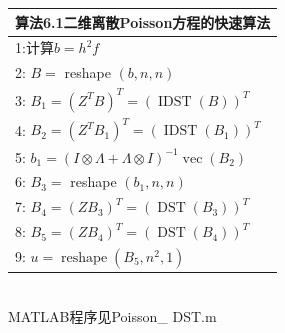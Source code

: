 \documentclass[notheorems,serif]{beamer}
\begin{document}
\begin{frame}
\begin{tabular}{l}
\hline
{\color{blue}算法6.1}二维离散Poisson方程的快速算法\\
\hline
1:计算$b=h^{2} f$\\
2: $B=$ reshape $(b, n, n)$\\
3: $B_{1}=\left(Z^{T} B\right)^{T}=(\operatorname{IDST}(B))^{T}$\\
4: $B_{2}=\left(Z^{T} B_{1}\right)^{T}=\left(\operatorname{IDST}\left(B_{1}\right)\right)^{T}$\\
5: $b_{1}=(I \otimes \Lambda+\Lambda \otimes I)^{-1} \operatorname{vec}\left(B_{2}\right)$\\
6: $B_{3}=$ reshape $\left(b_{1}, n, n\right)$\\
7: $B_{4}=\left(Z B_{3}\right)^{T}=\left(\operatorname{DST}\left(B_{3}\right)\right)^{T}$\\
8: $B_{5}=\left(Z B_{4}\right)^{T}=\left(\operatorname{DST}\left(B_{4}\right)\right)^{T}$\\
9: $u=\operatorname{reshape}\left(B_{5}, n^{2}, 1\right)$\\
\hline
\end{tabular}\\
MATLAB程序见{\color{blue}Poisson\_ DST.m}

\end{frame}
\end{document}
